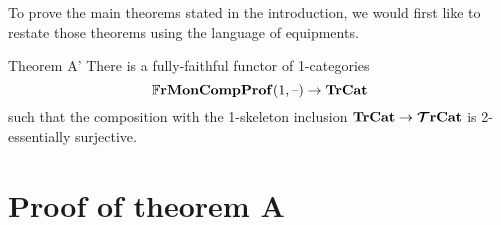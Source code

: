 \documentclass[12pt,oneside,article,draft]{memoir}
\begin{document}
To prove the main theorems stated in the introduction, we would first like to restate those theorems
using the language of equipments.

\begin{named}{Theorem A'}
   There is a fully-faithful functor of 1-categories
   \begin{equation*}
      \mathbb{F}\mathbf{rMonCompProf}(1,\textrm{--})\to\mathbf{TrCat}
   \end{equation*}
   such that the composition with the 1-skeleton inclusion $\mathbf{TrCat}\to\bm{\mathcal{T}}\mathbf{rCat}$ is 2-essentially
   surjective.
\end{named}

\section{Proof of theorem A}\label{sec:proof_of_A}
\end{document}
